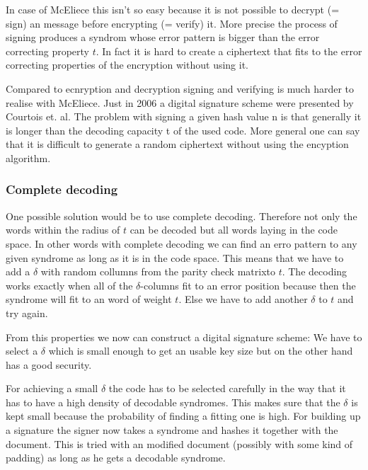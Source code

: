 In case of McEliece this isn't so easy because it is not possible to decrypt (= sign) an message before encrypting (= verify) it. More precise the process of signing produces a syndrom whose  error pattern is bigger than the error correcting property $t$. In fact it is hard to create a ciphertext that fits to the error correcting properties of the encryption without using it. 


Compared to ecnryption and decryption signing and verifying is much harder to realise with McEliece. Just in 2006 a digital signature scheme were presented by Courtois et. al. 
The problem with signing a given hash value n is that generally it is longer than the decoding capacity t of the used code. More general one can say that it is difficult to generate a random ciphertext without using the encyption algorithm. \cite{courtois2001achieve}


\subsubsection*{Complete decoding}
One possible solution would be to use complete decoding. Therefore not only the words within the radius of $t$ can be decoded but all words laying in the code space. In other words with complete decoding we can find an erro pattern to any given syndrome as long as it is in the code space. This means that we have to add a $\delta$ with random collumns from the parity check matrixto $t$. The decoding works exactly when all of the $\delta$-columns fit to an error position because then the syndrome will fit to an word of weight $t$. Else we have to add another $\delta$ to $t$ and try again.

From this properties we now can construct a digital signature scheme: We have to select a $\delta$ which is small enough to get an usable key size but on the other hand has a good security. 

For achieving a small $\delta$ the code has to be selected carefully in the way that it has to have a high density of decodable syndromes. This makes sure that the $\delta$ is kept small because the probability of finding a fitting one is high. For building up a signature the signer now takes a syndrome and hashes it together with the document. This is tried with an modified document (possibly with some kind of padding) as long as he gets a decodable syndrome. \cite{courtois2001achieve}


